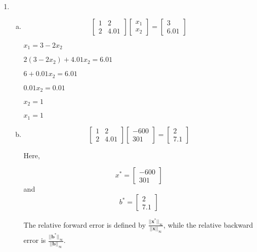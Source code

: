 \documentclass[11pt]{article}
\begin{document}
\begin{enumerate}
	\newpage

	\item
		\begin{enumerate}[(a)]

			\item
			\[
				\begin{bmatrix}
					1 & 2 \\
					2 & 4.01
				\end{bmatrix}
				\begin{bmatrix}
					x_1 \\
					x_2
				\end{bmatrix}
				=
				\begin{bmatrix}
					3 \\
					6.01
				\end{bmatrix}
			\]

			$x_1 = 3-2x_2$

			$2(3-2x_2) + 4.01x_2 = 6.01$

			$6 + 0.01x_2 = 6.01$

			$0.01x_2 = 0.01$

			$x_2 = 1$

			$x_1 = 1$ \\

			\item

			\[
				\begin{bmatrix}
					1 & 2 \\
					2 & 4.01
				\end{bmatrix}
				\begin{bmatrix}
					-600 \\
					301
				\end{bmatrix}
				=
				\begin{bmatrix}
					2 \\
					7.1
				\end{bmatrix}
			\]

			Here,

			\[
				x^* =
				\begin{bmatrix}
					-600 \\
					301
				\end{bmatrix}
			\]
			and
			\[
				b^* =
				\begin{bmatrix}
					2 \\
					7.1
				\end{bmatrix}
			\]

			The relative forward error is defined by $\frac{||\mathbf{x^*}||_{\infty}}{||\mathbf{x}||_{\infty}}$, while the
			relative backward error
			is $\frac{||\mathbf{b^*}||_{\infty}}{||\mathbf{b}||_{\infty}}$. \\


\end{enumerate}
\end{enumerate}
\end{document}

